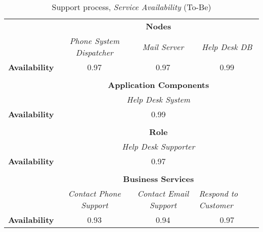 \begin{table}[H]
	\centering
	\begin{tabular}{|c|c|p{2.5cm}|p{2.5cm}|p{2.5cm}|p{2.5cm}|}

		\cline{3-6}

		\multicolumn{2}{c}{} & \multicolumn{4}{|c|}{\textbf{Nodes}} \\ \cline{3-6}
		\multicolumn{2}{c|}{} & \multicolumn{1}{|c|}{\textsl{Phone System Dispatcher}} & \multicolumn{2}{|c|}{\textsl{Mail Server}} &\multicolumn{1}{|c|}{\textsl{Help Desk DB}} \\ \hline
		\multicolumn{2}{|c|}{\textbf{Availability}} & \multicolumn{1}{|c|}{0.97} & \multicolumn{2}{|c|}{0.97} & \multicolumn{1}{|c|}{0.99} \\  \hline

		\multicolumn{6}{c}{} \\ \cline{3-6}							
		\multicolumn{2}{c}{} & \multicolumn{4}{|c|}{\textbf{Application Components}} \\ \cline{3-6}
		\multicolumn{2}{c|}{} & \multicolumn{4}{c|}{\textsl{Help Desk System}} \\
		\hline
		\multicolumn{2}{|c|}{\textbf{Availability}} & \multicolumn{4}{c|}{0.99} \\ \hline

	   \multicolumn{6}{c}{} \\ \cline{3-6}
		\multicolumn{2}{c}{} & \multicolumn{4}{|c|}{\textbf{Role}} \\ \cline{3-6}
		\multicolumn{2}{c|}{} & \multicolumn{4}{|c|}{\textsl{Help Desk Supporter}}\\ \hline
		\multicolumn{2}{|c|}{\textbf{Availability}}& \multicolumn{4}{|c|}{0.97} \\  \hline
		
		\multicolumn{6}{c}{} \\ \cline{3-6}
		\multicolumn{2}{c}{} & \multicolumn{4}{|c|}{\textbf{Business Services}} \\ \cline{3-6}
		\multicolumn{2}{c|}{} & \multicolumn{1}{|c|}{\textsl{Contact Phone Support}} & \multicolumn{2}{|c|}{\textsl{Contact Email Support}} & \multicolumn{1}{|p{2cm}|}{\textsl{Respond to Customer}}\\ \hline
		\multicolumn{2}{|c|}{\textbf{Availability}}& \multicolumn{1}{|c|}{0.93} & \multicolumn{2}{|c|}{0.94} & \multicolumn{1}{|c|}{0.97}\\ \hline
	\end{tabular}
\caption{Support process, \textsl{Service Availability} (To-Be)} 
\label{tab:support_to_be}
\end{table}